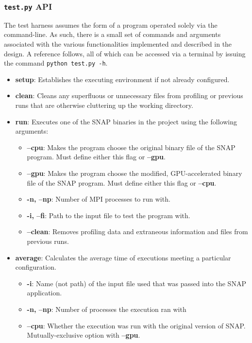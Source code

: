 \documentclass[conference]{IEEEtran}
\begin{document}
\subsubsection{\texttt{test.py} API}
\label{subsubsec:testapi}

The test harness assumes the form of a program operated solely via the command-line. As such, there is a small set of commands and arguments associated with the various functionalities implemented and described in the design. A reference follows, all of which can be accessed via a terminal by issuing the command \texttt{python test.py -h}.

\begin{itemize}
    \item \textbf{setup}: Establishes the executing environment if not already configured.
    \item \textbf{clean}: Cleans any superfluous or unnecessary files from profiling or previous runs that are otherwise cluttering up the working directory.
    \item \textbf{run}: Executes one of the SNAP binaries in the project using the following arguments:
    \begin{itemize}
        \item \textbf{--cpu}: Makes the program choose the original binary file of the SNAP program. Must define either this flag or \textbf{--gpu}.
        \item \textbf{--gpu}: Makes the program choose the modified, GPU-accelerated binary file of the SNAP program. Must define either this flag or \textbf{--cpu}.
        \item \textbf{-n, --np}: Number of MPI processes to run with.
        \item \textbf{-i, --fi}: Path to the input file to test the program with. 
        \item \textbf{--clean}: Removes profiling data and extraneous information and files from previous runs.
    \end{itemize}
    \item \textbf{average}: Calculates the average time of executions meeting a particular configuration.
    \begin{itemize}
        \item \textbf{-i}: Name (not path) of the input file used that was passed into the SNAP application.
        \item \textbf{-n, --np}: Number of processes the execution ran with
        \item \textbf{--cpu}: Whether the execution was run with the original version of SNAP. Mutually-exclusive option with \textbf{--gpu}.

\end{itemize}
\end{itemize}
\end{document}
